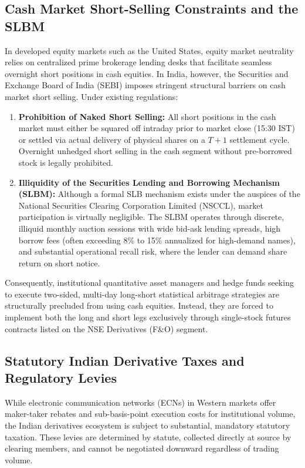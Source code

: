 \documentclass[11pt,a4paper]{article}
\begin{document}
\subsection{Cash Market Short-Selling Constraints and the SLBM}
In developed equity markets such as the United States, equity market neutrality relies on centralized prime brokerage lending desks that facilitate seamless overnight short positions in cash equities. In India, however, the Securities and Exchange Board of India (SEBI) imposes stringent structural barriers on cash market short selling. Under existing regulations:
\begin{enumerate}
    \item \textbf{Prohibition of Naked Short Selling:} All short positions in the cash market must either be squared off intraday prior to market close (15:30 IST) or settled via actual delivery of physical shares on a $T+1$ settlement cycle. Overnight unhedged short selling in the cash segment without pre-borrowed stock is legally prohibited.
    \item \textbf{Illiquidity of the Securities Lending and Borrowing Mechanism (SLBM):} Although a formal SLB mechanism exists under the auspices of the National Securities Clearing Corporation Limited (NSCCL), market participation is virtually negligible. The SLBM operates through discrete, illiquid monthly auction sessions with wide bid-ask lending spreads, high borrow fees (often exceeding 8\% to 15\% annualized for high-demand names), and substantial operational recall risk, where the lender can demand share return on short notice.
\end{enumerate}
Consequently, institutional quantitative asset managers and hedge funds seeking to execute two-sided, multi-day long-short statistical arbitrage strategies are structurally precluded from using cash equities. Instead, they are forced to implement both the long and short legs exclusively through single-stock futures contracts listed on the NSE Derivatives (F\&O) segment.

\subsection{Statutory Indian Derivative Taxes and Regulatory Levies}
While electronic communication networks (ECNs) in Western markets offer maker-taker rebates and sub-basis-point execution costs for institutional volume, the Indian derivatives ecosystem is subject to substantial, mandatory statutory taxation. These levies are determined by statute, collected directly at source by clearing members, and cannot be negotiated downward regardless of trading volume.
\end{document}
